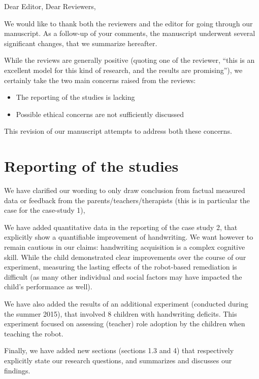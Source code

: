 \documentclass{article}
\begin{document}
Dear Editor, Dear Reviewers,

\vspace{2em}

We would like to thank both the reviewers and the editor for going through our
manuscript. As a follow-up of your comments, the manuscript underwent
several significant changes, that we summarize hereafter.

While the reviews are generally positive (quoting one of the reviewer, ``this
is an excellent model for this kind of research, and the results are
promising''), we certainly take the two main concerns raised from the reviews:

\begin{itemize}
    \item The reporting of the studies is lacking
    \item Possible ethical concerns are not sufficiently discussed
\end{itemize}

This revision of our manuscript attempts to address both these concerns.

\section*{Reporting of the studies}

We have clarified our wording to only draw conclusion from factual measured
data or feedback from the parents/teachers/therapists (this is in particular
the case for the case-study 1),

We have added quantitative data in the reporting of the case study 2, that
explicitly show a quantifiable improvement of handwriting. We want however to remain
cautious in our claims: handwriting acquisition is a complex cognitive skill.
While the child demonstrated clear improvements over the course of our
experiment, measuring the lasting effects of the robot-based remediation is
difficult (as many other individual and social factors may have impacted the
child's performance as well).

We have also added the results of an additional experiment (conducted during the
summer 2015), that involved 8 children with handwriting deficits. This
experiment focused on assessing (teacher) role adoption by the children when 
teaching the robot.

Finally, we have added new sections (sections 1.3 and 4) that respectively
explicitly state our research questions, and summarizes and discusses our findings.
\end{document}
